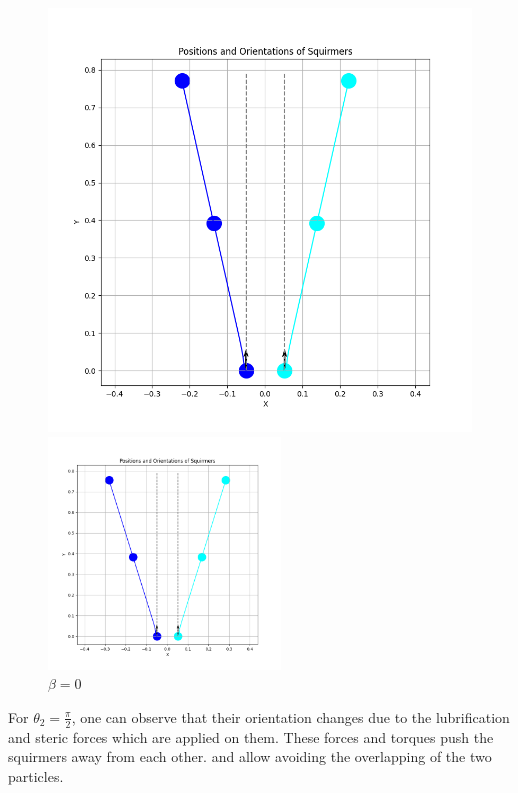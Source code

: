 \documentclass{article}
\begin{document}
\begin{figure}[H]
\begin{minipage}{0.49\textwidth}
        \includegraphics[width=1.1\textwidth]{graphs/simulations/sim_sq_sq/betam3/pi_2_.png}
        \caption{\footnotesize $\beta = -3$}
    \end{minipage}
    \includegraphics[width=0.55\textwidth]{graphs/simulations/sim_sq_sq/beta0/pi_2_.png}
    \caption{\footnotesize $\beta = 0$}
 \end{figure}
For $\theta_2 = \frac{\pi}{2}$, one can observe that their orientation changes due to the lubrification and steric forces which are applied on them. 
These forces and torques push the squirmers away from each other. and allow avoiding the overlapping of
 the two particles.\\
\end{document}
